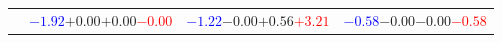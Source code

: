 \documentclass[compress]{beamer}
\begin{document}
\begin{frame}
\begin{tabular}{r | c | c | c}
          & \textcolor{blue}{$-1.92$}\hspace{0.1 cm}$+0.00$\hspace{0.1 cm}$+0.00$\hspace{0.1 cm}\textcolor{red}{$-0.00$} & \textcolor{blue}{$-1.22$}\hspace{0.1 cm}$-0.00$\hspace{0.1 cm}$+0.56$\hspace{0.1 cm}\textcolor{red}{$+3.21$} & \textcolor{blue}{$-0.58$}\hspace{0.1 cm}$-0.00$\hspace{0.1 cm}$-0.00$\hspace{0.1 cm}\textcolor{red}{$-0.58$} \\
\end{tabular}
\end{frame}
\end{document}
